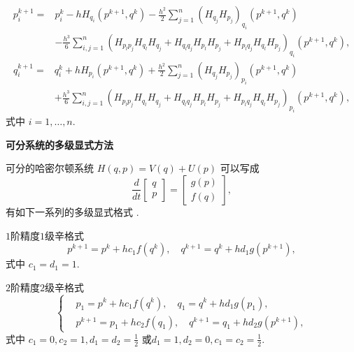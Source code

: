 \begin{equation*}
\begin{aligned}
	p_i^{k+1}= &p_i^{k}-hH_{q_i}(p^{k+1},q^{k})-\frac{h^2}{2}\sum_{j=1}^n(H_{q_j}H_{p_j})_{q_i}(p^{k+1},q^{k})\\
	&-\frac{h^3}{6}\sum_{i,j=1}^n(H_{p_lp_j}H_{q_l}H_{q_j}+H_{q_lq_j}H_{p_l}H_{p_j}+H_{p_lq_j}H_{q_l}H_{p_j})_{q_i}(p^{k+1},q^{k}),
\end{aligned}
\end{equation*}
\begin{equation*}
\begin{aligned}
	q_i^{k+1}= &q_i^{k}+hH_{p_i}(p^{k+1},q^{k})+\frac{h^2}{2}\sum_{j=1}^n(H_{q_j}H_{p_j})_{p_i}(p^{k+1},q^{k})\\
	&+\frac{h^3}{6}\sum_{i,j=1}^n(H_{p_lp_j}H_{q_l}H_{q_j}+H_{q_lq_j}H_{p_l}H_{p_j}+H_{p_lq_j}H_{q_l}H_{p_j})_{p_i}(p^{k+1},q^{k}),
\end{aligned}
\end{equation*}
式中 $i=1,\ldots,n$.

\noindent \textbf{可分系统的多级显式方法}

可分的哈密尔顿系统 $H(q,p)=V(q)+U(p)$ 可以写成
\begin{equation*}
	\frac{d}{dt}\begin{bmatrix}
	q\\
	p
	\end{bmatrix}=\begin{bmatrix}
	g(p)\\
	f(q)
	\end{bmatrix},
\end{equation*}
有如下一系列的多级显式格式 \cite{qin2011struc}.

$1$阶精度$1$级辛格式
\begin{equation*}
	p^{k+1}=p^{k}+hc_1f(q^{k}),\quad q^{k+1}=q^{k}+hd_1g(p^{k+1}),
\end{equation*}
式中 $c_1=d_1=1$.

$2$阶精度$2$级辛格式
\begin{equation*}
	\left\lbrace \begin{aligned}
		&p_1=p^{k}+hc_1f(q^{k}),\quad q_1=q^{k}+hd_1g(p_1),\\
		&p^{k+1}=p_1+hc_2f(q_1),\quad q^{k+1}=q_1+hd_2g(p^{k+1}),
	\end{aligned}\right.
\end{equation*}
式中 $c_1=0,c_2=1,d_1=d_2=\frac{1}{2}$ 或$d_1=1,d_2=0,c_1=c_2=\frac{1}{2}$.

